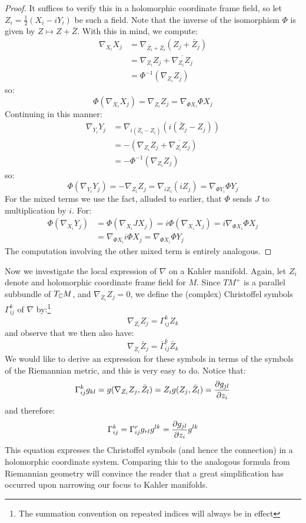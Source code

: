 \begin{proof}
%
It suffices to verify this in a holomorphic coordinate frame field, so let $Z_i = \frac{1}{2}(X_i - i Y_i)$ be such a field. Note that the inverse of the isomorphism $\Phi$ is given by $Z \mapsto Z + \bar{Z}$.  With this in mind, we compute:
%
\begin{align*}
\nabla_{X_i} X_j & = \nabla_{Z_i + \bar{Z}_i} ( Z_j + \bar{Z}_j ) \\
&= \nabla_{Z_i} Z_j + \overline{ \nabla_{Z_i} Z_j }\\
&= \Phi^{-1}( \nabla_{Z_i} Z_j )
\end{align*}
%
so:
%
$$ \Phi ( \nabla_{X_i} X_j ) = \nabla_{Z_i} Z_j = \nabla_{ \Phi X_i } \Phi X_j $$
%
Continuing in this manner:
%
\begin{align*}
\nabla_{Y_i} Y_j &= \nabla_{i(\bar{Z}_i - Z_i)} ( i(\bar{Z}_j - Z_j ) ) \\
&= - (\nabla_{Z_i} Z_j + \overline{ \nabla_{Z_i} Z_j } ) \\
&= - \Phi^{-1}( \nabla_{Z_i} Z_j ) 
\end{align*}
%
so:
%
$$ \Phi( \nabla_{Y_i} Y_j ) = -  \nabla_{Z_i} Z_j =  \nabla_{i Z_i}( i Z_j ) = \nabla_{ \Phi Y_i } \Phi Y_j $$
%
For the mixed terms we use the fact, alluded to earlier, that $\Phi$ sends $J$ to multiplication by $i$.  For:
%
\begin{align*}
\Phi( \nabla_{X_i} Y_j ) &= \Phi( \nabla_{X_i} J X_j ) = i \Phi( \nabla_{X_i} X_j ) = i \nabla_{\Phi X_i} \Phi X_j \\
&= \nabla_{\Phi X_i } i \Phi X_j = \nabla_{\Phi X_i} \Phi Y_j 
\end{align*}
%
The computation involving the other mixed term is entirely analogous. 
%
\end{proof}

Now we investigate the local expression of $\nabla$ on a Kahler manifold.  Again, let $Z_i$ denote and holomorphic coordinate frame field for $M$.  Since $TM^{+}$ is a parallel subbundle of $T_{\mathbb{C}}M$, and $\nabla_{\bar{Z}_i} Z_j = 0$, we define the (complex) Christoffel symbols $\Gamma_{ij}^k$ of $\nabla$ by:\footnote{The summation convention on repeated indices will always be in effect}
%
$$ \nabla_{Z_i} Z_j = \Gamma_{ij}^k Z_k $$
%
and observe that we then also have:
%
$$ \nabla_{ \bar{Z}_i } \bar{Z}_j = \bar{\Gamma}_{ij}^k \bar{Z}_k $$
%
We would like to derive an expression for these symbols in terms of the symbols of the Riemannian metric, and this is very easy to do.  Notice that:
%
$$ \Gamma_{ij}^k g_{kl} = g( \nabla_{Z_i} Z_j, \bar{Z}_l ) = Z_i g( Z_j, \bar{Z}_l ) = \frac{ \partial g_{jl} }{ \partial z_i } $$
%
and therefore:
%
$$ \Gamma_{ij}^k = \Gamma_{ij}^r g_{rl} g^{lk} = \frac{ \partial g_{jl} }{ \partial z_i } g^{lk} $$
%
This equation expresses the Christoffel symbols (and hence the connection) in a holomorphic coordinate system.  Comparing this to the analogous formula from Riemannian geometry will convince the reader that a great simplification has occurred upon narrowing our focus to Kahler manifolds.

